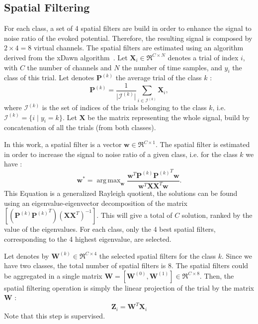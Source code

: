 \documentclass[11pt,a4paper]{article}
\newcommand{\argmax}{\mathop{\mathrm{arg\,max}}}
\begin{document}
\subsection{Spatial Filtering}
For each class, a set of 4 spatial filters are build in order to enhance the signal to noise ratio of the evoked potential. Therefore, the resulting signal is composed by $2\times 4 = 8 $ virtual channels. The spatial filters are estimated using an algorithm derived from the xDawn algorithm~\cite{xdawn}.
Let $\mathbf{X}_i \in \Re^{C \times N}$ denotes a trial of index $i$, with $C$ the number of channels and $N$ the number of time samples, and $y_i$ the class of this trial. Let denotes $\mathbf{P}^{(k)}$ the average trial of the class $k$ : 
\begin{equation}
\mathbf{P}^{(k)} = \frac{1}{\vert\mathcal{I}^{(k)} \vert} \sum_{i\in\mathcal{I}^{(k)}}\mathbf{X}_i,
\end{equation}
where $\mathcal{I}^{(k)}$ is the set of indices of the trials belonging to the class $k$, i.e. $\mathcal{I}^{(k)} = \lbrace i \; \vert \; y_i = k \rbrace$. Let $\mathbf{X}$ be the matrix representing the whole signal, build by concatenation of all the trials (from both classes). 

In this work, a spatial filter is a vector $\mathbf{w} \in \Re^{C \times 1}$. The spatial filter is estimated in order to increase the signal to noise ratio of a given class, i.e. for the class $k$ we have : 
\begin{equation}
\mathbf{w}^* = \argmax_{\mathbf{w}} \frac{\mathbf{w}^T \mathbf{P}^{(k)} {\mathbf{P}^{(k)}}^T \mathbf{w}}{\mathbf{w}^T\mathbf{X} \mathbf{X}^T  \mathbf{w}}.
\end{equation}
This Equation is a generalized Rayleigh quotient, the solutions can be found using an eigenvalue-eigenvector decomposition of the matrix $[(\mathbf{P}^{(k)} {\mathbf{P}^{(k)}}^T)(\mathbf{X} \mathbf{X}^T)^{-1}]$. This will give a total of $C$ solution, ranked by the value of the eigenvalues. For each class, only the 4 best spatial filters, corresponding to the 4 highest eigenvalue, are selected. 

Let denotes by $\mathbf{W}^{(k)} \in \Re^{C \times 4 }$ the selected spatial filters for the class $k$. Since we have two classes, the total number of spatial filters is 8. The spatial filters could be aggregated in a single matrix $\mathbf{W} = [ \mathbf{W}^{(0)} , \mathbf{W}^{(1)} ] \in \Re^{C \times 8}$. Then, the spatial filtering operation is simply the linear projection of the trial by the matrix $\mathbf{W}$ : 
\begin{equation}
\mathbf{Z}_i = \mathbf{W}^T \mathbf{X}_i
\end{equation}
Note that this step is supervised.
\end{document}
